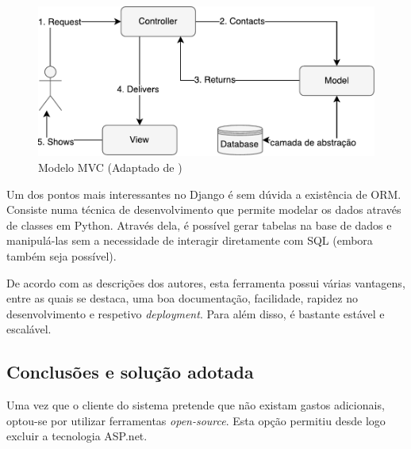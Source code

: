 \begin{figure}[!htb]
	\centering
	\includegraphics[scale=0.7]{esquemas/MVC-diagram.pdf}
	\caption[]{Modelo \ac{MVC} (Adaptado de \cite{Sugrue2013})}
	\label{mvcdiag}
\end{figure}


Um dos pontos mais interessantes no Django é sem dúvida a existência de \linebreak \ac{ORM}. Consiste numa técnica de desenvolvimento que permite modelar os dados através de classes em Python. Através dela, é possível gerar tabelas na base de dados e manipulá-las sem a necessidade de interagir diretamente com \ac{SQL} (embora também seja possível).

De acordo com as descrições dos autores, esta ferramenta possui várias vantagens, entre as quais se destaca, uma boa documentação, facilidade, rapidez no desenvolvimento e respetivo \textit{deployment}. Para além disso, é bastante estável e escalável\cite{Index}. 











\subsection{Conclusões e solução adotada}
\label{django-conclusao}


Uma vez que o cliente do sistema pretende que não existam gastos adicionais, optou-se por utilizar ferramentas \textit{open-source}. Esta opção permitiu desde logo excluir a tecnologia ASP.net. 


